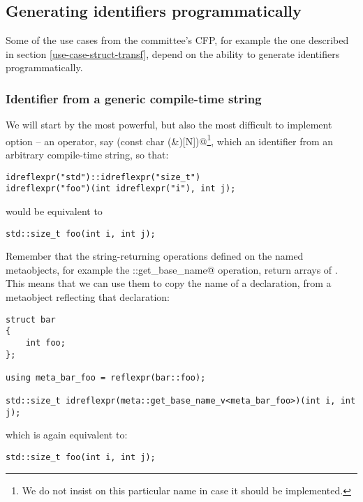 \subsection{Generating identifiers programmatically}
\label{fut-ident-gen}

Some of the use cases from the committee's CFP, for example the one described
in section \ref{use-case-struct-transf}, depend on the ability to generate
identifiers programmatically.

\subsubsection{Identifier from a generic compile-time string}
\label{fut-op-identifier1}

We will start by the most powerful, but also the most difficult to implement
option -- an operator, say \verb@idreflexpr(const char (&)[N])@\footnote{We
do not insist on this particular name in case it should be implemented.},
which  an identifier from an arbitrary compile-time string, so that:

\begin{verbatim}
idreflexpr("std")::idreflexpr("size_t")
idreflexpr("foo")(int idreflexpr("i"), int j);
\end{verbatim}

would be equivalent to 

\begin{verbatim}
std::size_t foo(int i, int j);
\end{verbatim}

Remember that the string-returning operations defined on the named metaobjects,
for example the \verb@meta::get_base_name@ operation, return \verb@constexpr@
arrays of \verb@char@s. This means that we can use them to copy the name of
a declaration, from a metaobject reflecting that declaration:

\begin{verbatim}
struct bar
{
	int foo;
};

using meta_bar_foo = reflexpr(bar::foo);

std::size_t idreflexpr(meta::get_base_name_v<meta_bar_foo>)(int i, int j);
\end{verbatim}

which is again equivalent to:

\begin{verbatim}
std::size_t foo(int i, int j);
\end{verbatim}


